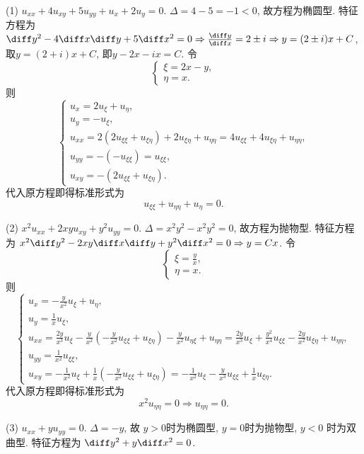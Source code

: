 \begin{solve}
  (1) $u_{xx}+4u_{xy}+5u_{yy}+u_x+2u_y=0$.
  $\Delta=4-5=-1<0$, 故方程为椭圆型.
  特征方程为 $\diff y^2-4\diff x\diff y+5\diff x^2=0\Rightarrow\frac{\diff y}{\diff x}=2\pm i\Rightarrow y=(2\pm i)x+C$, 取$y=(2+i)x+C$, 即$y-2x-ix=C$. 令
  \[\begin{cases}
  \xi=2x-y, \\
  \eta=x.
  \end{cases}\]
  则
  \[\begin{cases}
    u_x=2u_{\xi}+u_{\eta}, \\
    u_y=-u_{\xi}, \\
    u_{xx}=2(2u_{\xi\xi}+u_{\xi\eta})+2u_{\xi\eta}+u_{\eta\eta}=4u_{\xi\xi}+4u_{\xi\eta}+u_{\eta\eta}, \\
    u_{yy}=-(-u_{\xi\xi})=u_{\xi\xi}, \\
    u_{xy}=-(2u_{\xi\xi}+u_{\xi\eta}).
  \end{cases}\]
  代入原方程即得标准形式为
  \[u_{\xi\xi}+u_{\eta\eta}+u_{\eta} = 0.\]

  (2) $x^2u_{xx}+2xyu_{xy}+y^2u_{yy}=0$.
  $\Delta=x^2y^2-x^2y^2=0$, 故方程为抛物型.
  特征方程为 $x^2\diff y^2-2xy\diff x\diff y+y^2\diff x^2=0\Rightarrow y=Cx$. 令
  \[\begin{cases}
  \xi = \frac{y}{x}, \\
  \eta = x.
  \end{cases}\]
  则
  \[\begin{cases}
    u_x = -\frac{y}{x^2}u_{\xi}+u_{\eta}, \\
    u_y = \frac{1}{x}u_{\xi}, \\
    u_{xx} = \frac{2y}{x^3}u_{\xi}-\frac{y}{x^2}
      \left(-\frac{y}{x^2}u_{\xi\xi}+u_{\xi\eta}\right)-\frac{y}{x^2}u_{\eta\xi}+u_{\eta\eta}
      = \frac{2y}{x^3}u_{\xi}+\frac{y^2}{x^4}u_{\xi\xi}-\frac{2y}{x^2}u_{\xi\eta}+u_{\eta\eta}, \\
    u_{yy}=\frac{1}{x^2}u_{\xi\xi}, \\
    u_{xy}=-\frac{1}{x^2}u_{\xi}+\frac{1}{x}\left(-\frac{y}{x^2}u_{\xi\xi}+u_{\xi\eta}\right)
      = -\frac{1}{x^2}u_{\xi}-\frac{y}{x^3}u_{\xi\xi}+\frac{1}{x}u_{\xi\eta}.
  \end{cases}\]
  代入原方程即得标准形式为
  \[x^2u_{\eta\eta}=0\Rightarrow u_{\eta\eta} = 0.\]

  (3) $u_{xx}+yu_{yy}=0$.
  $\Delta=-y$, 故 $y>0$时为椭圆型, $y=0$时为抛物型, $y<0$ 时为双曲型.
  特征方程为 $\diff y^2+y\diff x^2=0$.


\end{solve}

